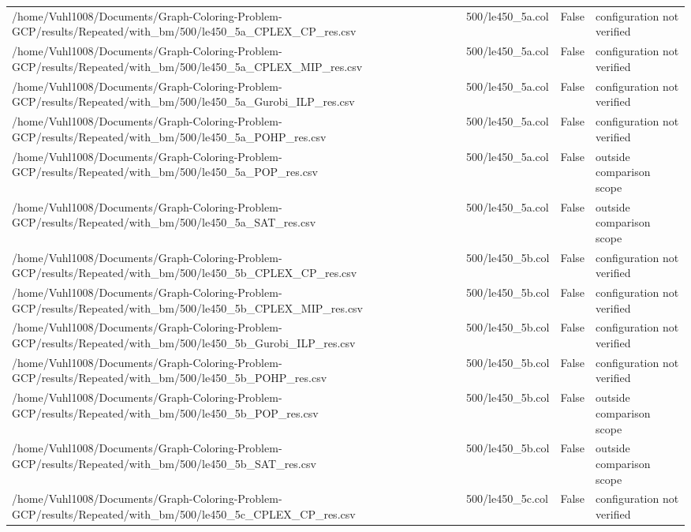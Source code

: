 \begin{table}[htbp]
\begin{tabular}{llll}
/home/Vuhl1008/Documents/Graph-Coloring-Problem-GCP/results/Repeated/with\_bm/500/le450\_5a\_CPLEX\_CP\_res.csv & 500/le450\_5a.col & False & configuration not verified \\
/home/Vuhl1008/Documents/Graph-Coloring-Problem-GCP/results/Repeated/with\_bm/500/le450\_5a\_CPLEX\_MIP\_res.csv & 500/le450\_5a.col & False & configuration not verified \\
/home/Vuhl1008/Documents/Graph-Coloring-Problem-GCP/results/Repeated/with\_bm/500/le450\_5a\_Gurobi\_ILP\_res.csv & 500/le450\_5a.col & False & configuration not verified \\
/home/Vuhl1008/Documents/Graph-Coloring-Problem-GCP/results/Repeated/with\_bm/500/le450\_5a\_POHP\_res.csv & 500/le450\_5a.col & False & configuration not verified \\
/home/Vuhl1008/Documents/Graph-Coloring-Problem-GCP/results/Repeated/with\_bm/500/le450\_5a\_POP\_res.csv & 500/le450\_5a.col & False & outside comparison scope \\
/home/Vuhl1008/Documents/Graph-Coloring-Problem-GCP/results/Repeated/with\_bm/500/le450\_5a\_SAT\_res.csv & 500/le450\_5a.col & False & outside comparison scope \\
/home/Vuhl1008/Documents/Graph-Coloring-Problem-GCP/results/Repeated/with\_bm/500/le450\_5b\_CPLEX\_CP\_res.csv & 500/le450\_5b.col & False & configuration not verified \\
/home/Vuhl1008/Documents/Graph-Coloring-Problem-GCP/results/Repeated/with\_bm/500/le450\_5b\_CPLEX\_MIP\_res.csv & 500/le450\_5b.col & False & configuration not verified \\
/home/Vuhl1008/Documents/Graph-Coloring-Problem-GCP/results/Repeated/with\_bm/500/le450\_5b\_Gurobi\_ILP\_res.csv & 500/le450\_5b.col & False & configuration not verified \\
/home/Vuhl1008/Documents/Graph-Coloring-Problem-GCP/results/Repeated/with\_bm/500/le450\_5b\_POHP\_res.csv & 500/le450\_5b.col & False & configuration not verified \\
/home/Vuhl1008/Documents/Graph-Coloring-Problem-GCP/results/Repeated/with\_bm/500/le450\_5b\_POP\_res.csv & 500/le450\_5b.col & False & outside comparison scope \\
/home/Vuhl1008/Documents/Graph-Coloring-Problem-GCP/results/Repeated/with\_bm/500/le450\_5b\_SAT\_res.csv & 500/le450\_5b.col & False & outside comparison scope \\
/home/Vuhl1008/Documents/Graph-Coloring-Problem-GCP/results/Repeated/with\_bm/500/le450\_5c\_CPLEX\_CP\_res.csv & 500/le450\_5c.col & False & configuration not verified \\

\end{tabular}
\end{table}
